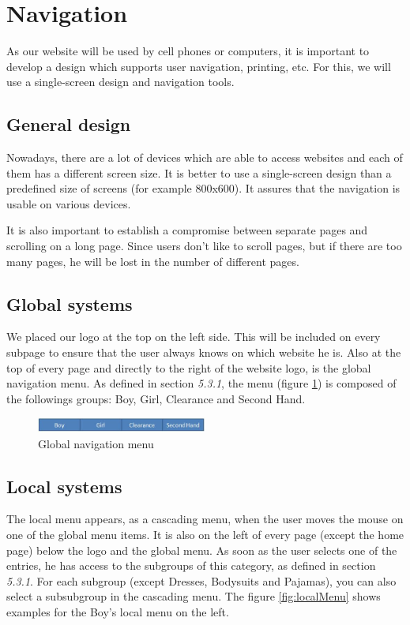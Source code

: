 \section{Navigation}

As our website will be used by cell phones or computers, it is important to develop a design which supports user navigation, printing, etc. For this, we will use a single-screen design and navigation tools.

\subsection{General design}

Nowadays, there are a lot of devices which are able to access websites and each of them has a different screen size. It is better to use a single-screen design than a predefined size of screens (for example 800x600). It assures that the navigation is usable on various devices. 

It is also important to establish a compromise between separate pages and scrolling on a long page. Since users don't like to scroll pages, but if there are too many pages, he will be lost in the number of different pages.


\subsection{Global systems}

We placed our logo at the top on the left side. This will be included on every subpage to ensure that the user always knows on which website he is.
Also at the top of every page and directly to the right of the website logo, is the global navigation menu. As defined in section \textit{5.3.1}, the menu (figure \ref{fig:globalMenu}) is composed of the followings groups: Boy, Girl, Clearance and Second Hand.

\begin{figure}[h!]
  \centering  
  \includegraphics[width=0.5\textwidth]{Images/globalMenu.jpg}                
  \caption{Global navigation menu}
  \label{fig:globalMenu}
\end{figure}


\subsection{Local systems}
The local menu appears, as a cascading menu, when the user moves the mouse on one of the global menu items. It is also on the left of every page (except the home page) below the logo and the global menu. As soon as the user selects one of the entries, he has access to the subgroups of this category, as defined in section \textit{5.3.1}. For each subgroup (except Dresses, Bodysuits and Pajamas), you can also select a subsubgroup in the cascading menu. The figure \ref{fig:localMenu} shows examples for the Boy's local menu on the left.

